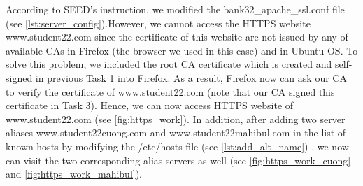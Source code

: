 According to SEED's instruction, we modified the {\selectfont
bank32\_apache\_ssl.conf} file (see \autoref{lst:server_config}).However, we
cannot access the HTTPS website {\selectfont
www.student22.com} since the certificate of this website are not issued by
any of available CAs in Firefox (the browser we used in this case) and in Ubuntu OS.
To solve this problem, we included the root CA certificate which is created and
self-signed in previous Task 1 into Firefox. As a result, Firefox now can ask
our CA to verify the certificate of {\selectfont
www.student22.com} (note that our CA signed this certificate in Task 3). Hence,
we can now access HTTPS website of {\selectfont
www.student22.com} (see \autoref{fig:https_work}). In addition, after adding two
server aliases {\selectfont www.student22cuong.com} and
{\selectfont www.student22mahibul.com} in the list of known hosts
by modifying the {\selectfont /etc/hosts} file (see \autoref{lst:add_alt_name})
, we now can visit the two corresponding alias servers as well (see
\autoref{fig:https_work_cuong} and \autoref{fig:https_work_mahibul}).